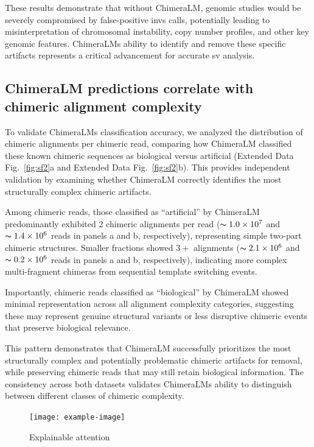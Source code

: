 \documentclass[pdflatex,sn-nature]{sn-jnl}%
\theoremstyle{thmstyleone}%
\theoremstyle{thmstyletwo}%
\theoremstyle{thmstylethree}%
\begin{document}
These results demonstrate that without ChimeraLM, genomic studies would be severely compromised by false-positive \glspl{inv} calls, potentially leading to misinterpretation of chromosomal instability, copy number profiles, and other key genomic features.
ChimeraLM\textquotesingle s ability to identify and remove these specific artifacts represents a critical advancement for accurate \gls{sv} analysis.

\subsection*{ChimeraLM predictions correlate with chimeric alignment complexity}

To validate ChimeraLM\textquotesingle s classification accuracy, we analyzed the distribution of chimeric alignments per chimeric read, comparing how ChimeraLM classified these known chimeric sequences as biological versus artificial (Extended Data Fig.~\ref{fig:sf2}a and Extended Data Fig.~\ref{fig:sf2}b).
This provides independent validation by examining whether ChimeraLM correctly identifies the most structurally complex chimeric artifacts.

Among chimeric reads, those classified as ``artificial'' by ChimeraLM predominantly exhibited 2 chimeric alignments per read ($\thicksim 1.0 \times 10^7$ and $\thicksim 1.4 \times 10^6$ reads in panels a and b, respectively), representing simple two-part chimeric structures.
Smaller fractions showed $3+$ alignments ($\thicksim 2.1 \times 10^6$ and $\thicksim 0.2 \times 10^6$ reads in panels a and b, respectively), indicating more complex multi-fragment chimeras from sequential template switching events.

Importantly, chimeric reads classified as ``biological'' by ChimeraLM showed minimal representation across all alignment complexity categories, suggesting these may represent genuine structural variants or less disruptive chimeric events that preserve biological relevance.

This pattern demonstrates that ChimeraLM successfully prioritizes the most structurally complex and potentially problematic chimeric artifacts for removal, while preserving chimeric reads that may still retain biological information.
The consistency across both datasets validates ChimeraLM\textquotesingle s ability to distinguish between different classes of chimeric complexity.

\begin{figure}[!ht]
	\begin{center}
		\texttt{[image: example-image]}
	\end{center}
	\caption{Explainable attention}\label{fig:figure4}
\end{figure}
\end{document}
